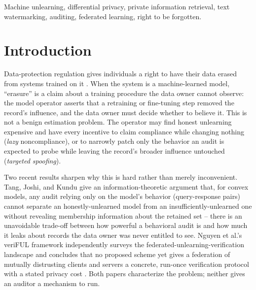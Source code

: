 \documentclass[10pt,journal,compsoc]{IEEEtran}
\begin{document}
\begin{abstract}
this guarantee is caught only 20\% of the time, against a 40\% analytic ceiling. Experiments on federated logistic regression over UCI German Credit, MNIST, and a 150{,}000-row Forest Covertype subsample, and on a real fine-tuned language model audited over the real TOFU fictitious-author benchmark, report both power and honestly-measured failure modes at small calibration-sample sizes, rather than tuning them away.
\end{abstract}

\begin{IEEEkeywords}
Machine unlearning, differential privacy, private information retrieval, text watermarking, auditing, federated learning, right to be forgotten.
\end{IEEEkeywords}

\section{Introduction}

Data-protection regulation gives individuals a right to have their data erased from systems trained on it \cite{gdpr2016}. When the system is a machine-learned model, ``erasure'' is a claim about a training procedure the data owner cannot observe: the model operator asserts that a retraining or fine-tuning step removed the record's influence, and the data owner must decide whether to believe it. This is not a benign estimation problem. The operator may find honest unlearning expensive and have every incentive to claim compliance while changing nothing (\emph{lazy} noncompliance), or to narrowly patch only the behavior an audit is expected to probe while leaving the record's broader influence untouched (\emph{targeted spoofing}).

Two recent results sharpen why this is hard rather than merely inconvenient. Tang, Joshi, and Kundu give an information-theoretic argument that, for convex models, any audit relying only on the model's behavior (query-response pairs) cannot separate an honestly-unlearned model from an insufficiently-unlearned one without revealing membership information about the retained set \cite{tang2026geometric} -- there is an unavoidable trade-off between how powerful a behavioral audit is and how much it leaks about records the data owner was never entitled to see. Nguyen et al.'s veriFUL framework independently surveys the federated-unlearning-verification landscape and concludes that no proposed scheme yet gives a federation of mutually distrusting clients and servers a concrete, run-once verification protocol with a stated privacy cost \cite{nguyen2025veriful}. Both papers characterize the problem; neither gives an auditor a mechanism to run.
\end{document}
